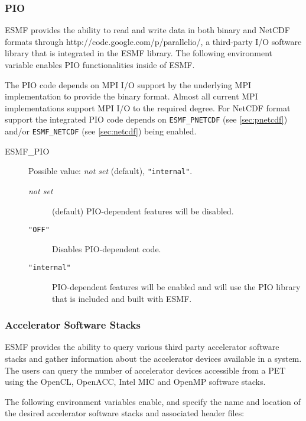 \subsubsection{PIO}
\label{sec:pio}
ESMF provides the ability to read and write data in both binary and 
NetCDF formats through 
{http://code.google.com/p/parallelio/}, a third-party I/O software
library that is integrated in the ESMF library. The following environment
variable enables PIO functionalities inside of ESMF.

The PIO code depends on MPI I/O support by the underlying MPI
implementation to provide the binary format. Almost all current MPI
implementations support MPI I/O to the required degree. For NetCDF format
support the integrated PIO code depends on {\tt ESMF\_PNETCDF}
(see \ref{sec:pnetcdf}) and/or {\tt ESMF\_NETCDF} (see \ref{sec:netcdf})
being enabled.

\begin{description}
\item[ESMF\_PIO] Possible value: {\it not set} (default), {\tt "internal"}.

\begin{description}
\item[{\it not set}] (default) PIO-dependent features will be disabled.

\item[{\tt "OFF"}] Disables PIO-dependent code.

\item[{\tt "internal"}] PIO-dependent features will be enabled and will use the 
PIO library that is included and built with ESMF.  

\end{description}

\end{description}

\subsubsection{Accelerator Software Stacks}
\label{sec:acc}
ESMF provides the ability to query various third party accelerator software
stacks and gather information about the accelerator devices available in a
system. The users can query the number of accelerator devices accessible
from a PET using the OpenCL, OpenACC, Intel MIC and OpenMP software stacks.

The following environment variables enable, and specify the name and location
of the desired accelerator software stacks and associated header files:

